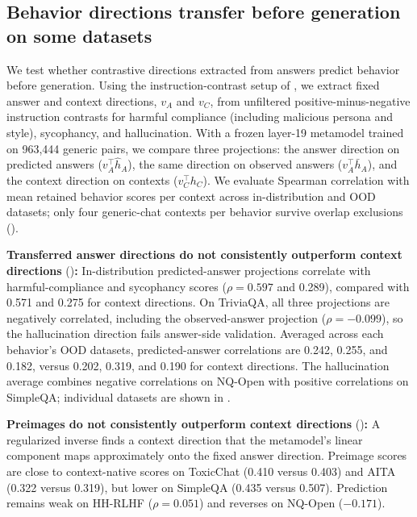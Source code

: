 \subsection{Behavior directions transfer before generation on some datasets}
\label{sec:results-behavior}

We test whether contrastive directions extracted from answers predict behavior before generation. Using the instruction-contrast setup of \citet{chen2025personavectors}, we extract fixed answer and context directions, $v_A$ and $v_C$, from unfiltered positive-minus-negative instruction contrasts for harmful compliance (including malicious persona and style), sycophancy, and hallucination. With a frozen layer-19 metamodel trained on 963,444 generic pairs, we compare three projections: the answer direction on predicted answers ($v_A^\top\hat h_A$), the same direction on observed answers ($v_A^\top\bar h_A$), and the context direction on contexts ($v_C^\top h_C$). We evaluate Spearman correlation with mean retained behavior scores per context across in-distribution and OOD datasets; only four generic-chat contexts per behavior survive overlap exclusions ().

\noindent\textbf{Transferred answer directions do not consistently outperform context directions} ()\textbf{:} In-distribution predicted-answer projections correlate with harmful-compliance and sycophancy scores ($\rho=0.597$ and 0.289), compared with 0.571 and 0.275 for context directions. On TriviaQA, all three projections are negatively correlated, including the observed-answer projection ($\rho=-0.099$), so the hallucination direction fails answer-side validation. Averaged across each behavior's OOD datasets, predicted-answer correlations are 0.242, 0.255, and 0.182, versus 0.202, 0.319, and 0.190 for context directions. The hallucination average combines negative correlations on NQ-Open with positive correlations on SimpleQA; individual datasets are shown in .

\noindent\textbf{Preimages do not consistently outperform context directions} ()\textbf{:} A regularized inverse finds a context direction that the metamodel's linear component maps approximately onto the fixed answer direction. Preimage scores are close to context-native scores on ToxicChat (0.410 versus 0.403) and AITA (0.322 versus 0.319), but lower on SimpleQA (0.435 versus 0.507). Prediction remains weak on HH-RLHF ($\rho=0.051$) and reverses on NQ-Open ($-0.171$).

